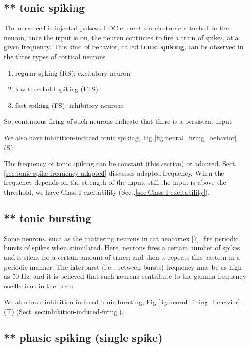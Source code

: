 \subsection{** tonic spiking}
\label{sec:tonic-spike}

The nerve cell is injected pulses of DC current via electrode attached to the
neuron, once the input is on, the neuron continues to fire a train of spikes, 
at a given frequency.
This kind of behavior, called {\bf tonic spiking}, can be observed in the three
types of cortical neurons
\begin{enumerate}
  \item regular spking (RS): excitatory neuron
  
  \item low-threshold spiking (LTS): 
  
  \item fast spiking (FS): inhibitory neurons
\end{enumerate}
So, continuous firing of such neurons indicate that there is a persistent input

We also have inhibition-induced tonic spiking,
Fig.\ref{fig:neural_firing_behavior} (S).

The frequency of tonic spiking can be constant (this section) or adapted.
Sect.\ref{sec:tonic-spike-frequency-adapted} discusses adapted frequency.
When the frequency depends on the strength of the input, still the input is
above the threshold, we have Class I excitability
(Sect.\ref{sec:Class-I-excitability}).

\subsection{** tonic bursting}
\label{sec:tonic-bursting}

Some neurons, such as the chattering neurons in cat neocortex
[7], fire periodic bursts of spikes when stimulated.
Here, neurons fires a certain number of spikes and is silent for a certain
amount of times; and then it repeats this pattern in a periodic manner.
The interburst (i.e., between bursts) frequency may be as high
as 50 Hz, and it is believed that such neurons contribute to the
gamma-frequency oscillations in the brain

We also have inhibition-induced tonic bursting,
Fig.\ref{fig:neural_firing_behavior} (T)
(Sect.\ref{sec:inhibition-induced-firing}).

\subsection{** phasic spiking (single spike)}
\label{sec:phasic-spiking}

